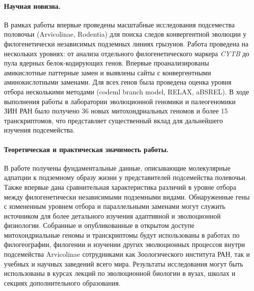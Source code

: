 \paragraph{Научная новизна.} В рамках работы впервые проведены масштабные исследования подсемества половочьи (Arvicolinae, Rodentia) для поиска следов конвергентной эволюции у филогенетически независимых подземных линиях грызунов. Работа проведена на нескольких уровнях: от анализа отдельного филогенетического маркера \textit{CYTB} до пула ядерных белок-кодирующих генов. Впервые проанализированы амикислотные паттерные замен и выявлены сайты с конвергентными аминокислотными заменами. Для всех генов была проведена оценка уровня отбора несколькими методами (codeml branch model, RELAX, aBSREL). В ходе выполнения работы в лаборатории эволюционной геномики и палеогеномики ЗИН РАН было получено 36 новых митохондриальных геномов и более 15 транскриптомов, что представляет существенный вклад для дальнейшего изучения подсемейства. 

\paragraph{Теоретическая и практическая значимость работы.} В работе получены фундаментальные данные, описывающие молекулярные адпатции к подземному образу жизни у представителей подсемейства полевочьи. Также впервые дана сравнительная характеристика различий в уровне отбора между филогенетически независимыми подземными видами. Обнаруженные гены с измененным уровнем отбора и параллельными заменами могут служить источником для более детального изучения адаптивной и эволюционной физиологии. Собранные и опубликованные в открытом доступе митохондриальные геномы и транскриптомы будут использованы в работах по филогеографии, филогении и изучении других эволюционных процессов внутри подсемейства Arvicolinae сотрудниками как Зоологического института РАН, так и учебных и научных заведений всего мира. Результаты исследования могут быть использованы в курсах лекций по эволюционной биологии в вузах, школах и секциях дополнительного образования.

